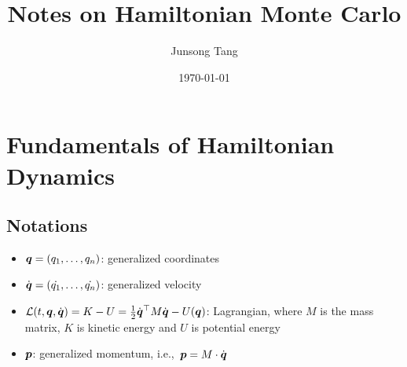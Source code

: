 \documentclass[hidelinks]{article}[12pt]
\title{\bf Notes on Hamiltonian Monte Carlo}
\author{Junsong Tang}
\date{\today}
\begin{document}
\maketitle


\section{Fundamentals of Hamiltonian Dynamics}
\subsection{Notations}
\begin{itemize}
    \item $\boldsymbol{q} = (q_1, \ldots, q_n)$: generalized coordinates
    \item $\dot{\boldsymbol{q}} = (\dot{q_1}, \ldots, \dot{q_n})$: generalized velocity
    \item ${\cal L}(t, \boldsymbol{q}, \dot{\boldsymbol{q}}) = K - U = \frac12 \dot{\boldsymbol{q}}^\top M \dot{\boldsymbol{q}} - U(\boldsymbol{q})$: Lagrangian, where $M$ is the mass matrix, $K$ is kinetic energy and $U$ is potential energy
    \item $\boldsymbol{p}$: generalized momentum, i.e.,\ $\boldsymbol{p} = M \cdot \dot{\boldsymbol{q}}$
\end{itemize}
\end{document}

